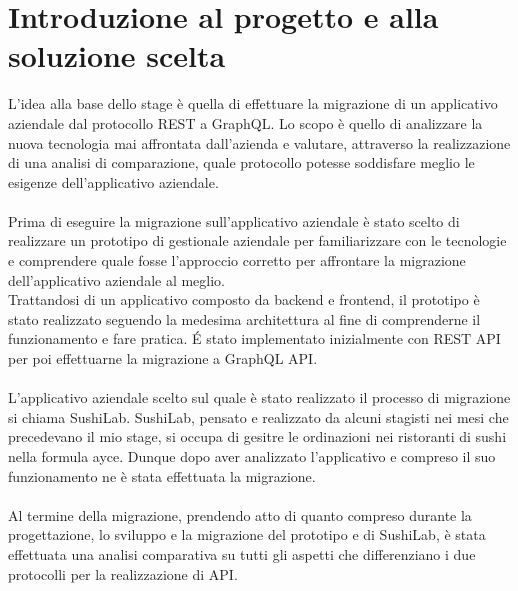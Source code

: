 \section{Introduzione al progetto e alla soluzione scelta}
L'idea alla base dello stage è quella di effettuare la migrazione di un applicativo aziendale dal protocollo REST a GraphQL. Lo scopo è quello di analizzare la nuova tecnologia mai affrontata dall'azienda e valutare, attraverso la realizzazione di una analisi di comparazione, quale protocollo potesse soddisfare meglio le esigenze dell'applicativo aziendale.\\ \\
Prima di eseguire la migrazione sull'applicativo aziendale è stato scelto di realizzare un prototipo di gestionale aziendale per familiarizzare con le tecnologie e comprendere quale fosse l'approccio corretto per affrontare la migrazione dell'applicativo aziendale al meglio.\\
Trattandosi di un applicativo composto da backend e frontend, il prototipo è stato realizzato seguendo la medesima architettura al fine di comprenderne il funzionamento e fare pratica. É stato implementato inizialmente con REST API per poi effettuarne la migrazione a GraphQL API.\\ \\
L'applicativo aziendale scelto sul quale è stato realizzato il processo di migrazione si chiama SushiLab. SushiLab, pensato e realizzato da alcuni stagisti nei mesi che precedevano il mio stage, si occupa di gesitre le ordinazioni nei ristoranti di sushi nella formula \gls{ayce}. Dunque dopo aver analizzato l'applicativo e compreso il suo funzionamento ne è stata effettuata la migrazione.\\ \\
Al termine della migrazione, prendendo atto di quanto compreso durante la progettazione, lo sviluppo e la migrazione del prototipo e di SushiLab, è stata effettuata una analisi comparativa su tutti gli aspetti che differenziano i due protocolli per la realizzazione di API.
